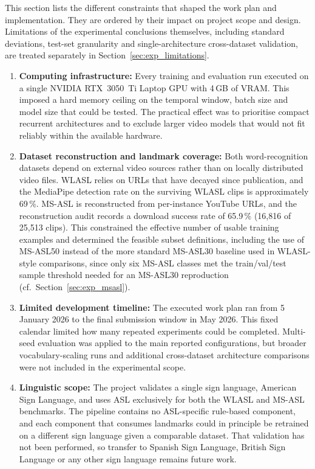This section lists the different constraints that shaped the work plan and implementation. They are
ordered by their impact on project scope and design. Limitations of the experimental conclusions
themselves, including standard deviations, test-set granularity and single-architecture
cross-dataset validation, are treated separately in Section~\ref{sec:exp_limitations}.

\begin{enumerate}
    \item \textbf{Computing infrastructure:} Every training and evaluation run executed on a single
          NVIDIA RTX~3050~Ti Laptop GPU with 4\,GB of VRAM. This imposed a hard memory ceiling on
          the temporal window, batch size and model size that could be tested. The practical effect
          was to prioritise compact recurrent architectures and to exclude larger video models that
          would not fit reliably within the available hardware.

    \item \textbf{Dataset reconstruction and landmark coverage:} Both word-recognition datasets
          depend on external video sources rather than on locally distributed video files. WLASL
          relies on URLs that have decayed since publication, and the MediaPipe detection rate on
          the surviving WLASL clips is approximately 69\,\%. MS-ASL is reconstructed from
          per-instance YouTube URLs, and the reconstruction audit records a download success rate of
          65.9\,\% (16{,}816 of 25{,}513 clips). This constrained the effective number of usable
          training examples and determined the feasible subset definitions, including the use of
          MS-ASL50 instead of the more standard MS-ASL30 baseline used in WLASL-style comparisons,
          since only six MS-ASL classes met the train/val/test sample threshold needed for an
          MS-ASL30 reproduction (cf.\ Section~\ref{sec:exp_msasl}).

    \item \textbf{Limited development timeline:} The executed work plan ran from 5 January 2026 to the
          final submission window in May 2026. This fixed calendar limited how many repeated
          experiments could be completed. Multi-seed evaluation was applied to the main reported
          configurations, but broader vocabulary-scaling runs and additional cross-dataset
          architecture comparisons were not included in the experimental scope.

    \item \textbf{Linguistic scope:} The project validates a single sign language, American Sign
          Language, and uses ASL exclusively for both the WLASL and MS-ASL benchmarks. The pipeline
          contains no ASL-specific rule-based component, and each component that consumes landmarks
          could in principle be retrained on a different sign language given a comparable dataset.
          That validation has not been performed, so transfer to Spanish Sign Language, British
          Sign Language or any other sign language remains future work.
\end{enumerate}
